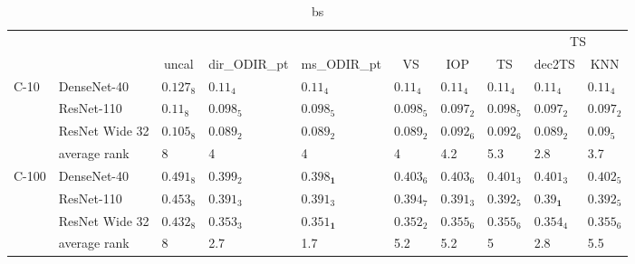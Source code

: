 \begin{table*}
\caption{bs}
\label{table:bs}
\centering
\begin{adjustbox}{width=\textwidth}

\begin{tabular}{llllllllll}
\toprule
\multicolumn{8}{c}{}&\multicolumn{2}{c}{TS}\\
\cmidrule{9-10}
\multicolumn{1}{c}{}&\multicolumn{1}{c}{}&\multicolumn{1}{c}{uncal}&\multicolumn{1}{c}{dir_ODIR_pt}&\multicolumn{1}{c}{ms_ODIR_pt}&\multicolumn{1}{c}{VS}&\multicolumn{1}{c}{IOP}&\multicolumn{1}{c}{TS}&\multicolumn{1}{c}{dec2TS}&\multicolumn{1}{c}{KNN}\\\midrule
C-10 & DenseNet-40 &  $0.127_{8}$ &   $0.11_{4}$ &            $0.11_{4}$ &   $0.11_{4}$ &   $0.11_{4}$ &   $0.11_{4}$ &           $0.11_{4}$ &   $0.11_{4}$ \\
      & ResNet-110 &   $0.11_{8}$ &  $0.098_{5}$ &           $0.098_{5}$ &  $0.098_{5}$ &  $0.097_{2}$ &  $0.098_{5}$ &          $0.097_{2}$ &  $0.097_{2}$ \\
      & ResNet Wide 32 &  $0.105_{8}$ &  $0.089_{2}$ &           $0.089_{2}$ &  $0.089_{2}$ &  $0.092_{6}$ &  $0.092_{6}$ &          $0.089_{2}$ &   $0.09_{5}$ \\
\cmidrule{2-10}
      & average rank &            8 &            4 &                     4 &            4 &          4.2 &          5.3 &                  2.8 &          3.7 \\
\cmidrule{1-10}
C-100 & DenseNet-40 &  $0.491_{8}$ &  $0.399_{2}$ &  $\mathbf{0.398_{1}}$ &  $0.403_{6}$ &  $0.403_{6}$ &  $0.401_{3}$ &          $0.401_{3}$ &  $0.402_{5}$ \\
      & ResNet-110 &  $0.453_{8}$ &  $0.391_{3}$ &           $0.391_{3}$ &  $0.394_{7}$ &  $0.391_{3}$ &  $0.392_{5}$ &  $\mathbf{0.39_{1}}$ &  $0.392_{5}$ \\
      & ResNet Wide 32 &  $0.432_{8}$ &  $0.353_{3}$ &  $\mathbf{0.351_{1}}$ &  $0.352_{2}$ &  $0.355_{6}$ &  $0.355_{6}$ &          $0.354_{4}$ &  $0.355_{6}$ \\
\cmidrule{2-10}
      & average rank &            8 &          2.7 &                   1.7 &          5.2 &          5.2 &            5 &                  2.8 &          5.5 \\
\bottomrule
\end{tabular}


\end{adjustbox}
\end{table*}